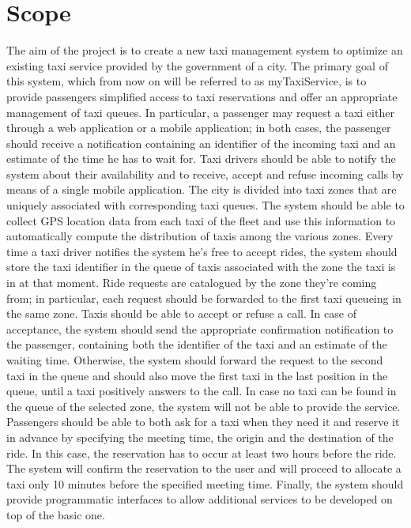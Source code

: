 \documentclass{book}
\begin{document}
\section{Scope}
The aim of the project is to create a new taxi management system to optimize an existing taxi service provided by the government of a city. The primary goal of this system, which from now on will be referred to as myTaxiService, is to provide passengers simplified access to taxi reservations and offer an appropriate management of taxi queues. In particular, a passenger may request a taxi either through a web application or a mobile application; in both cases, the passenger should receive a notification containing an identifier of the incoming taxi and an estimate of the time he has to wait for. Taxi drivers should be able to notify the system about their availability and to receive, accept and refuse incoming calls by means of a single mobile application. The city is divided into taxi zones that are uniquely associated with corresponding taxi queues. The system should be able to collect GPS location data from each taxi of the fleet and use this information to automatically compute the distribution of taxis among the various zones. Every time a taxi driver notifies the system he’s free to accept rides, the system should store the taxi identifier in the queue of taxis associated with the zone the taxi is in at that moment. Ride requests are catalogued by the zone they’re coming from; in particular, each request should be forwarded to the first taxi queueing in the same zone. Taxis should be able to accept or refuse a call. In case of acceptance, the system should send the appropriate confirmation notification to the passenger, containing both the identifier of the taxi and an estimate of the waiting time. Otherwise, the system should forward the request to the second taxi in the queue and should also move the first taxi in the last position in the queue, until a taxi positively answers to the call. In case no taxi can be found in the queue of the selected zone, the system will not be able to provide the service. Passengers should be able to both ask for a taxi when they need it and reserve it in advance by specifying the meeting time, the origin and the destination of the ride. In this case, the reservation has to occur at least two hours before the ride. The system will confirm the reservation to the user and will proceed to allocate a taxi only 10 minutes before the specified meeting time. Finally, the system should provide programmatic interfaces to allow additional services to be developed on top of the basic one.
\end{document}
